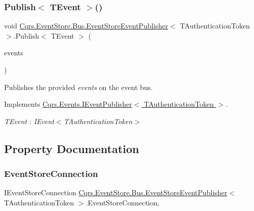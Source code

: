 \subsubsection{\texorpdfstring{Publish$<$ T\+Event $>$()}{Publish< TEvent >()}\hspace{0.1cm}{\footnotesize\ttfamily [2/2]}}
{\footnotesize\ttfamily void \hyperlink{classCqrs_1_1EventStore_1_1Bus_1_1EventStoreEventPublisher}{Cqrs.\+Event\+Store.\+Bus.\+Event\+Store\+Event\+Publisher}$<$ T\+Authentication\+Token $>$.Publish$<$ T\+Event $>$ (\begin{DoxyParamCaption}\item[{I\+Enumerable$<$ T\+Event $>$}]{events }\end{DoxyParamCaption})}



Publishes the provided {\itshape events}  on the event bus. 



Implements \hyperlink{interfaceCqrs_1_1Events_1_1IEventPublisher_a2cbcc3d2c24d015abef6337714ec51ff}{Cqrs.\+Events.\+I\+Event\+Publisher$<$ T\+Authentication\+Token $>$}.

\begin{Desc}
\item[Type Constraints]\begin{description}
\item[{\em T\+Event} : {\em I\+Event$<$T\+Authentication\+Token$>$}]\end{description}
\end{Desc}


\subsection{Property Documentation}
\mbox{\label{classCqrs_1_1EventStore_1_1Bus_1_1EventStoreEventPublisher_a16df48a7203bc3bcde5f5a12f1d47934}} 
\subsubsection{\texorpdfstring{Event\+Store\+Connection}{EventStoreConnection}}
{\footnotesize\ttfamily I\+Event\+Store\+Connection \hyperlink{classCqrs_1_1EventStore_1_1Bus_1_1EventStoreEventPublisher}{Cqrs.\+Event\+Store.\+Bus.\+Event\+Store\+Event\+Publisher}$<$ T\+Authentication\+Token $>$.Event\+Store\+Connection\hspace{0.3cm}{\ttfamily [get]}, {\ttfamily [protected]}}

